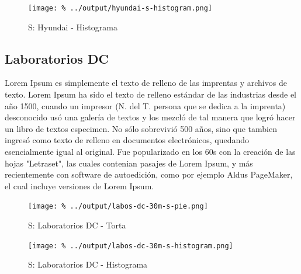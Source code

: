 \documentclass[final,narroweqnarray,inline]{ieee}
\begin{document}
    \begin{figure}[ht]\begin{center}
      \texttt{[image: \%
      ../output/hyundai-s-histogram.png]}
      \caption{S: Hyundai - Histograma}
      \label{hyundai-s-histogram}
    \end{center}\end{figure}

  \subsection{Laboratorios DC}

Lorem Ipsum es simplemente el texto de relleno de las imprentas y archivos de texto. Lorem Ipsum ha sido el texto de relleno estándar de las industrias desde el año 1500, cuando un impresor (N. del T. persona que se dedica a la imprenta) desconocido usó una galería de textos y los mezcló de tal manera que logró hacer un libro de textos especimen. No sólo sobrevivió 500 años, sino que tambien ingresó como texto de relleno en documentos electrónicos, quedando esencialmente igual al original. Fue popularizado en los 60s con la creación de las hojas "Letraset", las cuales contenian pasajes de Lorem Ipsum, y más recientemente con software de autoedición, como por ejemplo Aldus PageMaker, el cual incluye versiones de Lorem Ipsum.

    \begin{figure}[ht]\begin{center}
      \texttt{[image: \%
      ../output/labos-dc-30m-s-pie.png]}
      \vspace{-3em}
      \caption{S: Laboratorios DC - Torta}
      \label{labos-dc-30m-s-pie}
    \end{center}\end{figure}

    \begin{figure}[ht]\begin{center}
      \texttt{[image: \%
      ../output/labos-dc-30m-s-histogram.png]}
      \caption{S: Laboratorios DC - Histograma}
      \label{labos-dc-30m-s-histogram}
    \end{center}\end{figure}
\end{document}
